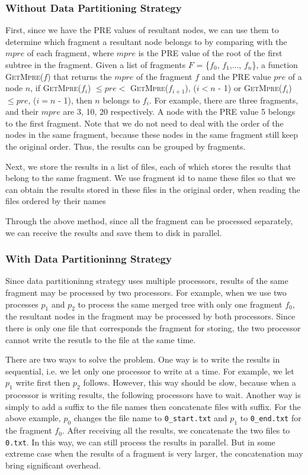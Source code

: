 \subsubsection{Without Data Partitioning Strategy}

First, since we have the PRE values of resultant nodes, we can use them to
determine which fragment a resultant node belongs to by comparing with the
$mpre$ of each fragment, where $mpre$ is the PRE value of the root of the first
subtree in the fragment. Given a list of fragments $F$ = \{$f_0$, $f_1$,...,
$f_n$\}, a function \textsc{GetMpre($f$)} that returns the $mpre$ of the
fragment $f$ and the PRE value $pre$ of a node $n$, if \textsc{GetMpre($f_i$)}
$\leq pre <$ \textsc{GetMpre($f_{i+1}$)}, ($i  < n$ - 1) or
\textsc{GetMpre($f_i$)}$\leq pre$, ($i = n$ - 1), then $n$ belongs to $f_i$. For
example, there are three fragments, and their $mpre$ are 3, 10, 20 respectively.
A node with the PRE value 5 belongs to the first fragment. Note that we do not
need to deal with the order of the nodes in the same fragment, because these
nodes in the same fragment still keep the original order. Thus, the results can
be grouped by fragments.

Next, we store the results in a list of files, each of which stores the results
that belong to the same fragment. We use fragment id to name these files so
that we can obtain the results stored in these files in the original order, when
reading the files ordered by their names

Through the above method, since all the fragment can be processed separately, we
can receive the results and save them to disk in parallel.

\subsubsection{With Data Partitioninng Strategy}

Since data partitioninng strategy uses multiple processors, results of the same
fragment may be processed by two processors. For example, when we use two
processes $p_1$ and $p_2$ to process the same merged tree with only one fragment
$f_0$, the resultant nodes in the fragment may be processed by both processors.
Since there is only one file that corresponds the fragment for storing, the two
processor cannot write the resutls to the file at the same time.

There are two ways to solve the problem. One way is to write the results in
sequential, i.e. we let only one processor to write at a time. For example, we
let $p_1$ write first then $p_2$ follows. However, this way should be slow, because
when a processor is writing results, the following processors have to wait.
Another way is simply to add a suffix to the file names then concatenate files
with suffix. For the above example, $p_0$ changes the file name to
\texttt{0\_start.txt} and $p_1$ to \texttt{0\_end.txt} for the fragment $f_0$.
After receiving all the results, we concatenate the two files to \texttt{0.txt}.
In this way, we can still process the results in parallel. But in some extreme
case when the results of a fragment is very larger, the concatenation may bring
significant overhead.



